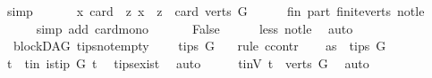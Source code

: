 \begin{isabellebody}
\ simp\isanewline
\ \ \isamarkupfalse%
\isanewline
\ \ \isamarkupfalse%
\ {\isachardoublequoteopen}{\isasymforall}x{\isachardot}{\kern0pt}\ card\ \ {\isacharbraceleft}{\kern0pt}z{\isachardot}{\kern0pt}\ x\ {\isasymrightarrow}\isactrlsup {\isacharplus}{\kern0pt}\ z{\isacharbraceright}{\kern0pt}\ {\isasymle}\ card\ {\isacharparenleft}{\kern0pt}verts\ G{\isacharparenright}{\kern0pt}{\isachardoublequoteclose}\isanewline
\ \ \ \ \isamarkupfalse%
\ fin\ part\ finite{\isacharunderscore}{\kern0pt}verts\ not{\isacharunderscore}{\kern0pt}le\isanewline
\ \ \ \ \isamarkupfalse%
\ {\isacharparenleft}{\kern0pt}simp\ add{\isacharcolon}{\kern0pt}\ card{\isacharunderscore}{\kern0pt}mono{\isacharparenright}{\kern0pt}\ \isanewline
\ \ \isamarkupfalse%
\ \isamarkupfalse%
\ False\isanewline
\ \ \ \ \isamarkupfalse%
\ less\ not{\isacharunderscore}{\kern0pt}le\ \isamarkupfalse%
\ auto\isanewline
{}\isamarkupfalse%
%
\endisatagproof
{\isafoldproof}%
%
\isadelimproof
\isanewline
%
\endisadelimproof
\isanewline
{}\isamarkupfalse%
\ {\isacharparenleft}{\kern0pt}\ blockDAG{\isacharparenright}{\kern0pt}\ tips{\isacharunderscore}{\kern0pt}not{\isacharunderscore}{\kern0pt}empty{\isacharcolon}{\kern0pt}\ \isanewline
\ \ \ {\isachardoublequoteopen}tips\ G\ {\isasymnoteq}\ {\isacharbraceleft}{\kern0pt}{\isacharbraceright}{\kern0pt}{\isachardoublequoteclose}\ \isanewline
%
\isadelimproof
%
\endisadelimproof
%
\isatagproof
{}\isamarkupfalse%
{\isacharparenleft}{\kern0pt}rule\ ccontr{\isacharparenright}{\kern0pt}\isanewline
\ \ \isamarkupfalse%
\ as{}{\isacharcolon}{\kern0pt}\ {\isachardoublequoteopen}{\isasymnot}\ tips\ G\ {\isasymnoteq}\ {\isacharbraceleft}{\kern0pt}{\isacharbraceright}{\kern0pt}{\isachardoublequoteclose}\ \isanewline
\ \ \isamarkupfalse%
\ t\ \ t{\isacharunderscore}{\kern0pt}in{\isacharcolon}{\kern0pt}\ {\isachardoublequoteopen}is{\isacharunderscore}{\kern0pt}tip\ G\ t{\isachardoublequoteclose}\ \isamarkupfalse%
\ tips{\isacharunderscore}{\kern0pt}exist\ \isamarkupfalse%
\ auto\isanewline
\ \ \isamarkupfalse%
\ \isamarkupfalse%
\ t{\isacharunderscore}{\kern0pt}inV{\isacharcolon}{\kern0pt}\ {\isachardoublequoteopen}t\ {\isasymin}\ verts\ G{\isachardoublequoteclose}\ \isamarkupfalse%
\ auto\isanewline
\ \ \isamarkupfalse%

\end{isabellebody}
